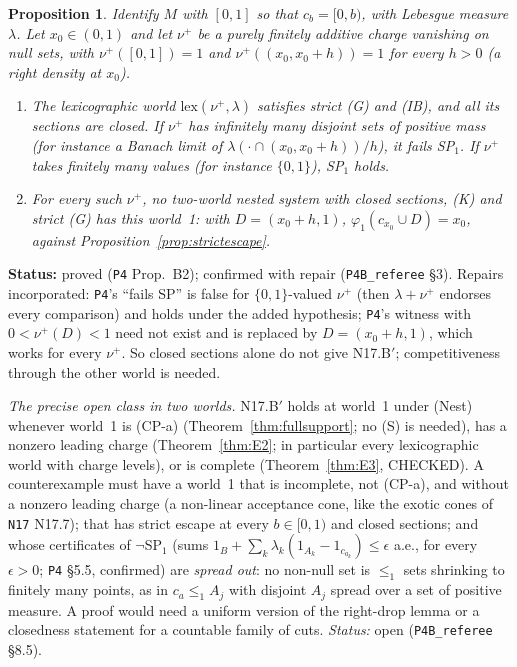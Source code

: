 \documentclass[11pt]{article}
\newtheorem{proposition}[theorem]{Proposition}
\theoremstyle{definition}
\theoremstyle{remark}
\newcommand{\src}[1]{\texttt{#1}}
\newcommand{\status}[1]{\par\smallskip\noindent\textbf{Status:} #1\par\smallskip}
\begin{document}
\begin{proposition}\label{prop:B2}
Identify $M$ with $[0,1]$ so that $c_b=[0,b)$, with Lebesgue measure $\lambda$. Let $x_0\in(0,1)$ and let $\nu^+$ be a purely finitely additive charge vanishing on null sets, with $\nu^+([0,1])=1$ and $\nu^+((x_0,x_0+h))=1$ for every $h>0$ (a right density at $x_0$).
\begin{enumerate}[leftmargin=*,label=(\alph*)]
\item The lexicographic world $\mathrm{lex}(\nu^+,\lambda)$ satisfies strict (G) and (IB), and all its sections are closed. If $\nu^+$ has infinitely many disjoint sets of positive mass (for instance a Banach limit of $\lambda(\cdot\cap(x_0,x_0+h))/h$), it fails SP$_1$. If $\nu^+$ takes finitely many values (for instance $\{0,1\}$), SP$_1$ holds.
\item For every such $\nu^+$, no two-world nested system with closed sections, (K) and strict (G) has this world~1: with $D=(x_0+h,1)$, $\varphi_1(c_{x_0}\cup D)=x_0$, against Proposition~\ref{prop:strictescape}.
\end{enumerate}
\end{proposition}
\status{proved (\src{P4} Prop.~B2); confirmed with repair (\src{P4B\_referee} \S3). Repairs incorporated: \src{P4}'s ``fails SP'' is false for $\{0,1\}$-valued $\nu^+$ (then $\lambda+\nu^+$ endorses every comparison) and holds under the added hypothesis; \src{P4}'s witness with $0<\nu^+(D)<1$ need not exist and is replaced by $D=(x_0+h,1)$, which works for every $\nu^+$. So closed sections alone do not give N17.B$'$; competitiveness through the other world is needed.}

\emph{The precise open class in two worlds.} N17.B$'$ holds at world~1 under (Nest) whenever world~1 is (CP-a) (Theorem~\ref{thm:fullsupport}; no (S) is needed), has a nonzero leading charge (Theorem~\ref{thm:E2}; in particular every lexicographic world with charge levels), or is complete (Theorem~\ref{thm:E3}, CHECKED). A counterexample must have a world~1 that is incomplete, not (CP-a), and without a nonzero leading charge (a non-linear acceptance cone, like the exotic cones of \src{N17} N17.7); that has strict escape at every $b\in[0,1)$ and closed sections; and whose certificates of $\neg$SP$_1$ (sums $1_B+\sum_k\lambda_k(1_{A_k}-1_{c_{a_k}})\le\epsilon$ a.e., for every $\epsilon>0$; \src{P4} \S5.5, confirmed) are \emph{spread out}: no non-null set is $\le_1$ sets shrinking to finitely many points, as in $c_a\le_1A_j$ with disjoint $A_j$ spread over a set of positive measure. A proof would need a uniform version of the right-drop lemma or a closedness statement for a countable family of cuts. \emph{Status:} open (\src{P4B\_referee} \S8.5).
\end{document}
